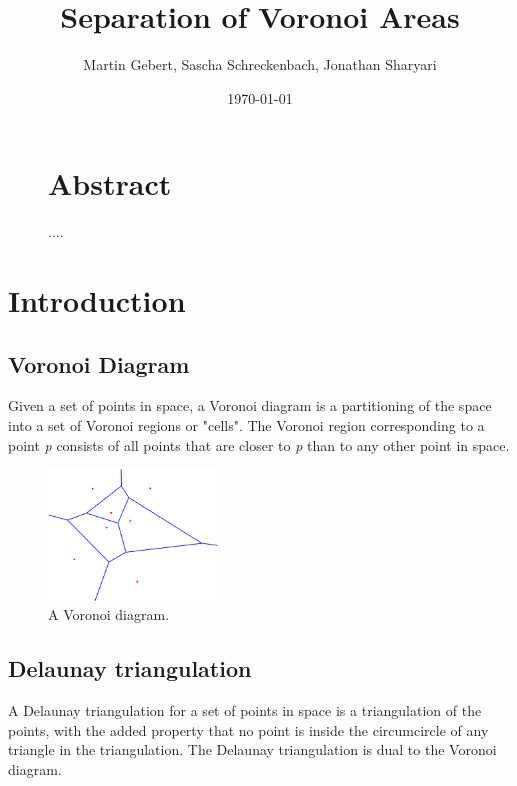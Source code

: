 \documentclass[a4paper,12pt]{article}
\title{\textbf{Separation of Voronoi Areas}}
\author{Martin Gebert, Sascha Schreckenbach, Jonathan Sharyari}  %
\date{\today}
\begin{document}
\maketitle

\begin{figure}
\section*{\large Abstract}
....
\end{figure}
\newpage

\section{Introduction}
\subsection{Voronoi Diagram}
Given a set of points in space, a Voronoi diagram is a partitioning of the space into a set of Voronoi regions or "cells". The Voronoi region corresponding to a point \emph{p} consists of all points that are closer to \emph{p} than to any other point in space.

\begin{figure}[hb]
\centering
\includegraphics[width=0.4\textwidth]{pictures/Voronoi-diagram.png}
 \caption[Close up of \textit{Hemidactylus} sp.]
{A Voronoi diagram.}
\end{figure}

\subsection{Delaunay triangulation}
A Delaunay triangulation for a set of points in space is a triangulation of the points, with the added property that no point is inside the circumcircle of any triangle in the triangulation. \newline
The Delaunay triangulation is dual to the Voronoi diagram. 
\end{document}
